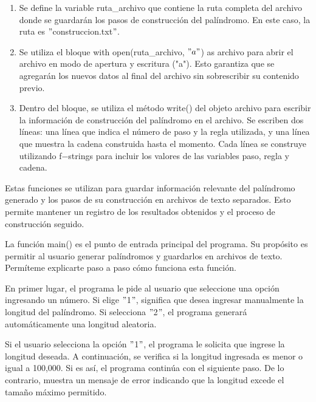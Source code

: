 \begin{enumerate}

\item Se define la variable ruta\_archivo que contiene la ruta completa del archivo donde se guardarán los pasos de construcción del palíndromo. En este caso, la ruta es $"$construccion.txt$"$.\newline

\item Se utiliza el bloque with open(ruta\_archivo, $"a"$) as archivo para abrir el archivo en modo de apertura y escritura ("a"). Esto garantiza que se agregarán los nuevos datos al final del archivo sin sobrescribir su contenido previo.\newline

\item Dentro del bloque, se utiliza el método write() del objeto archivo para escribir la información de construcción del palíndromo en el archivo. Se escriben dos líneas: una línea que indica el número de paso y la regla utilizada, y una línea que muestra la cadena construida hasta el momento. Cada línea se construye utilizando f$-$strings para incluir los valores de las variables paso, regla y cadena.\newline
\end{enumerate}

Estas funciones se utilizan para guardar información relevante del palíndromo generado y los pasos de su construcción en archivos de texto separados. Esto permite mantener un registro de los resultados obtenidos y el proceso de construcción seguido.\newline

La función main() es el punto de entrada principal del programa. Su propósito es permitir al usuario generar palíndromos y guardarlos en archivos de texto. Permíteme explicarte paso a paso cómo funciona esta función.\newline

En primer lugar, el programa le pide al usuario que seleccione una opción ingresando un número. Si elige $"$1$"$, significa que desea ingresar manualmente la longitud del palíndromo. Si selecciona $"$2$"$, el programa generará automáticamente una longitud aleatoria.\newline

Si el usuario selecciona la opción $"$1$"$, el programa le solicita que ingrese la longitud deseada. A continuación, se verifica si la longitud ingresada es menor o igual a 100,000. Si es así, el programa continúa con el siguiente paso. De lo contrario, muestra un mensaje de error indicando que la longitud excede el tamaño máximo permitido.\newline

